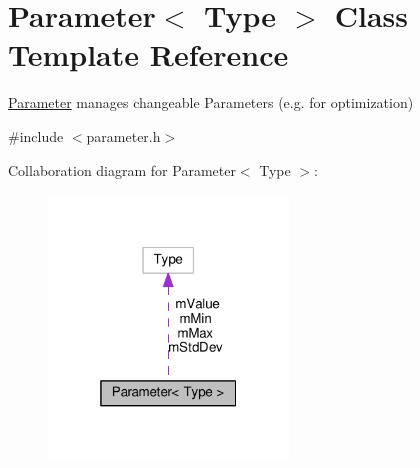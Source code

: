 \hypertarget{classParameter}{}\section{Parameter$<$ Type $>$ Class Template Reference}
\label{classParameter}


\hyperlink{classParameter}{Parameter} manages changeable Parameters (e.\+g. for optimization)  




{\ttfamily \#include $<$parameter.\+h$>$}



Collaboration diagram for Parameter$<$ Type $>$\+:\nopagebreak
\begin{figure}[H]
\begin{center}
\leavevmode
\includegraphics[width=181pt]{classParameter__coll__graph}
\end{center}
\end{figure}
